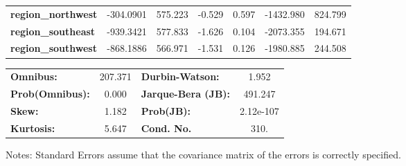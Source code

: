 \begin{center}
\begin{tabular}{lcccccc}
\textbf{region\_northwest} &    -304.0901  &      575.223     &    -0.529  &         0.597        &    -1432.980    &      824.799     \\
\textbf{region\_southeast} &    -939.3421  &      577.833     &    -1.626  &         0.104        &    -2073.355    &      194.671     \\
\textbf{region\_southwest} &    -868.1886  &      566.971     &    -1.531  &         0.126        &    -1980.885    &      244.508     \\
\bottomrule
\end{tabular}
\begin{tabular}{lclc}
\textbf{Omnibus:}       & 207.371 & \textbf{  Durbin-Watson:     } &     1.952  \\
\textbf{Prob(Omnibus):} &   0.000 & \textbf{  Jarque-Bera (JB):  } &   491.247  \\
\textbf{Skew:}          &   1.182 & \textbf{  Prob(JB):          } & 2.12e-107  \\
\textbf{Kurtosis:}      &   5.647 & \textbf{  Cond. No.          } &      310.  \\
\bottomrule
\end{tabular}
\end{center}

Notes: \newline
 [1] Standard Errors assume that the covariance matrix of the errors is correctly specified.